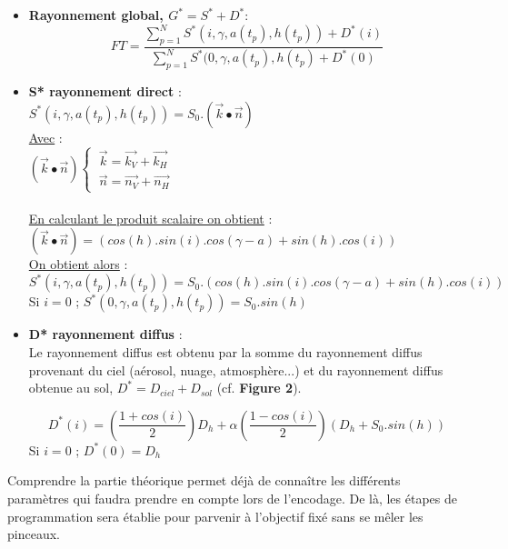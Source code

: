 \documentclass[12pt,a4paper,openright]{report}
\begin{document}
\begin{itemize}
\item \textbf{Rayonnement global, $G^*=S^*+D^*$}: 
	\begin{equation}
	FT = \frac{\sum_{p=1}^N S^*(i,\gamma,a(t_p),h(t_p))+ D^*(i)}{\sum_{p=1}^N S^*(0,\gamma,a(t_p),h(t_p)+ D^*(0)}
	\end{equation}	 
	
\item \textbf{S* rayonnement direct} :\\
$S^*(i,\gamma,a(t_p),h(t_p))= S_0.(\vec{k}\bullet\vec{n})$\\
\noindent \underline{Avec} :\\
$(\vec{k}\bullet\vec{n}) \left\{
    \begin{array}{ll}
        \ \vec{k}=\vec{k_V}+\vec{k_H} \\
        \ \vec{n}= \vec{n_V} + \vec{n_H}
    \end{array}
\right. $\\
\\
\underline{En calculant le produit scalaire on obtient} :\\
$(\vec{k}\bullet\vec{n})= (cos(h).sin(i).cos(\gamma - a) + sin(h).cos(i))$\\

\underline {On obtient alors} :
	\begin{equation}
	S^*(i,\gamma,a(t_p),h(t_p))= S_0.(cos(h).sin(i).cos(\gamma - a) + sin(h).cos(i))
	\end{equation}
	Si $i=0$ ; $S^*(0,\gamma,a(t_p),h(t_p))=S_0.sin(h)$\\
	
\item \textbf{D* rayonnement diffus} :\\
Le rayonnement diffus est obtenu par la somme du rayonnement diffus provenant du ciel (aérosol, nuage, atmosphère...) et du rayonnement diffus obtenue au sol, $D^* = D_{ciel} + D_{sol}$ (cf. \textbf{Figure 2}).

 	\begin{equation}
D^*(i) = \left(\frac{1+cos(i)}{2}\right)D_h + \alpha\left(\frac{1-cos(i)}{2}\right)\left(D_h + S_0.sin(h)\right)
	\end{equation}
	Si $i=0$ ; $D^*(0)= D_h$
\end{itemize}
\newpage
Comprendre la partie théorique permet déjà de connaître les différents paramètres qui faudra prendre en compte lors de l'encodage. De là, les étapes de programmation sera établie pour parvenir à l'objectif fixé sans se mêler les pinceaux.
\end{document}
